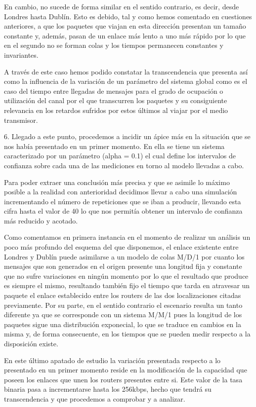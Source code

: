 En cambio, no sucede de forma similar en el sentido contrario, es decir, desde Londres hasta Dublín. Esto es debido, tal y como hemos comentado en cuestiones anteriores, a que los paquetes que viajan en esta dirección presentan un tamaño constante y, además, pasan de un enlace más lento a uno más rápido por lo que en el segundo no se forman colas y los tiempos permanecen constantes y invariantes.

A través de este caso hemos podido constatar la transcendencia que presenta así como la influencia de la variación de un parámetro del sistema global como es el caso del tiempo entre llegadas de mensajes para el grado de ocupación o utilización del canal por el que transcurren los paquetes y su consiguiente relevancia en los retardos sufridos por estos últimos al viajar por el medio transmisor.

6.
Llegado a este punto, procedemos a incidir un ápice más en la situación que se nos había presentado en un primer momento. En ella se tiene un sistema caracterizado por un parámetro (alpha = 0.1) el cual define los intervalos de confianza sobre cada una de las mediciones en torno al modelo llevadas a cabo.

Para poder extraer una conclusión más precisa y que se asimile lo máximo posible a la realidad con anterioridad decidimos llevar a cabo una simulación incrementando el número de repeticiones que se iban a producir, llevando esta cifra hasta el valor de 40 lo que nos permitía obtener un intervalo de confianza más reducido y acotado.

Como comentamos en primera instancia en el momento de realizar un análisis un poco más profundo del esquema del que disponemos, el enlace existente entre Londres y Dublín puede asimilarse a un modelo de colas M/D/1 por cuanto los mensajes que son generados en el origen presente una longitud fija y constante que no sufre variaciones en ningún momento por lo que el resultado que produce es siempre el mismo, resultando también fijo el tiempo que tarda en atravesar un paquete el enlace establecido entre los routers de las dos localizaciones citadas previamente. Por su parte, en el sentido contrario el escenario resulta un tanto diferente ya que se corresponde con un sistema M/M/1 pues la longitud de los paquetes sigue una distribución exponecial, lo que se traduce en cambios en la misma y, de forma consecuente, en los tiempos que se pueden medir respecto a la disposición existe.

En este último apatado de estudio la variación presentada respecto a lo presentado en un primer momento reside en la modificación de la capacidad que poseen los enlaces que unen los routers presentes entre si. Este valor de la tasa binaria pasa a incrementarse hasta los 256kbps, hecho que tendrá su transcendencia y que procedemos a comprobar y a analizar.

